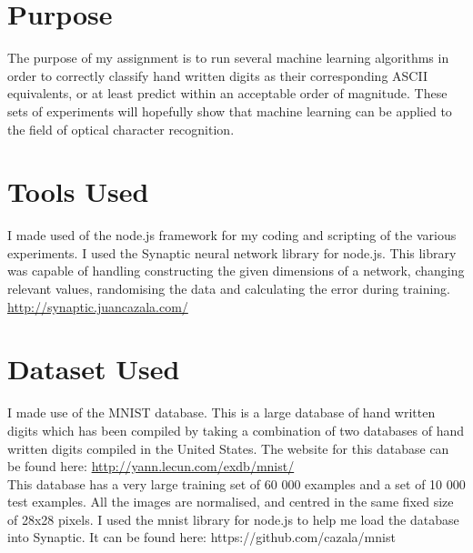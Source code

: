 \documentclass[11pt]{article}
\begin{document}
\begin{page}
\section{Purpose}
The purpose of my assignment is to run several machine learning algorithms in order to correctly classify hand written digits as their corresponding ASCII equivalents, or at least predict within an acceptable order of magnitude. These sets of experiments will hopefully show that machine learning can be applied to the field of optical character recognition.

\section{Tools Used}
I made used of the node.js framework for my coding and scripting of the various experiments. I used the Synaptic neural network library for node.js. This library was capable of handling constructing the given dimensions of a network, changing relevant values, randomising the data and calculating the error during training. \url{http://synaptic.juancazala.com/}

\section{Dataset Used}
I made use of the MNIST database. This is a large database of hand written digits which has been compiled by taking a combination of two databases of hand written digits compiled in the United States. The website for this database can be found here: \url{http://yann.lecun.com/exdb/mnist/} \\

This database has a very large training set of 60 000 examples and a set of 10 000 test examples. All the images are normalised, and centred in the same fixed size of 28x28 pixels.
I used the mnist library for node.js to help me load the database into Synaptic. It can be found here: https://github.com/cazala/mnist \\\\


\end{page}
\end{document}
